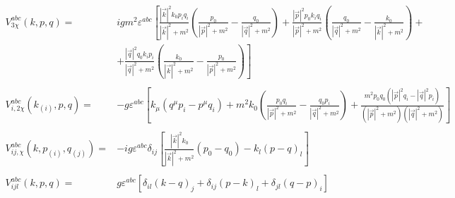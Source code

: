 \documentclass{article}
\begin{document}
\hfill\break
\vspace{-10mm}
\begin{equation}
    \begin{split}
        V^{abc}_{3\chi}(k,p,q)=&igm^2\varepsilon^{abc}\left[\frac{|\vec{k}|^2k_0p_iq_i}{|\vec{k}|^2+m^2}\left(\frac{p_0}{|\vec{p}|^2+m^2}-\frac{q_0}{|\vec{q}|^2+m^2}\right)+ \frac{|\vec{p}|^2p_0k_iq_i}{|\vec{p}|^2+m^2}\left(\frac{q_0}{|\vec{q}|^2+m^2}-\frac{k_0}{|\vec{k}|^2+m^2}\right)+\right.\\
      & \left.+\frac{|\vec{q}|^2q_0k_ip_i}{|\vec{q}|^2+m^2}\left(\frac{k_0}{|\vec{k}|^2+m^2}-\frac{p_0}{|\vec{p}|^2+m^2}\right)\right]\\\\
      V^{abc}_{i,2\chi}(k_{(i)},p,q)=&-g\varepsilon^{abc}\left[
     k_{\mu}\left(q^{\mu}p_i-p^{\mu}q_i\right)+m^2k_0\left(\frac{p_0q_i}{|\vec{p}|^2+m^2}-\frac{q_0p_i}{|\vec{q}|^2+m^2}\right)
   +\frac{m^2p_0q_0\left(|\vec{p}|^2q_i-|\vec{q}|^2p_i\right)}{(|\vec{p}|^2+m^2)(|\vec{q}|^2+m^2)}\right]\\\\
    V_{ij,\chi}^{abc}(k,p_{(i)},q_{(j)})=&-ig\varepsilon^{abc}\delta_{ij}\left[\frac{|\vec{k}|^2k_0}{|\vec{k}|^2+m^2}(p_0-q_0)-k_l(p-q)_l\right]\\\\
     V_{ijl}^{abc}(k,p,q)=&g\varepsilon^{abc}\left[\delta_{il}(k-q)_j+\delta_{ij}(p-k)_l+\delta_{jl}(q-p)_i\right]
    \end{split}
\end{equation}
\end{document}
